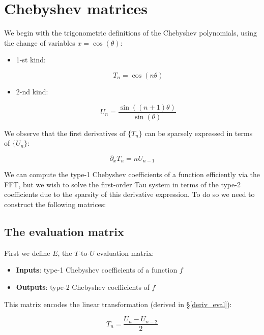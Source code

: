 \documentclass{article}
\begin{document}
\section{Chebyshev matrices}

We begin with the trigonometric definitions of the Chebyshev polynomials, using the change of variables $x = \cos(\theta)$:

\begin{itemize}
    \item 1-st kind:
    
    \begin{equation*}
    T_n = \cos(n \theta)
    \end{equation*}
    
    \item 2-nd kind:
    
    \begin{equation*}
    U_n = \frac{\sin((n+1) \theta)}{\sin(\theta)}
    \end{equation*}
\end{itemize}

We observe that the first derivatives of $\{T_n\}$ can be sparsely expressed in terms of $\{U_n\}$:

\begin{equation*}
\partial_x T_n = n U_{n-1}
\end{equation*}

We can compute the type-1 Chebyshev coefficients of a function efficiently via the FFT, but we wish to solve the first-order Tau system in terms of the type-2 coefficients due to the sparsity of this derivative expression.  To do so we need to construct the following matrices:

\subsection{The evaluation matrix}

First we define $E$, the $T$-to-$U$ evaluation matrix:

\begin{itemize}
    \item \textbf{Inputs}: type-1 Chebyshev coefficients of a function $f$
    \item \textbf{Outputs}: type-2 Chebyshev coefficients of $f$
\end{itemize}

This matrix encodes the linear transformation (derived in \S \ref{deriv_eval}):

\begin{equation*}
T_n = \frac{U_n - U_{n-2}}{2}
\end{equation*} 
\end{document}
